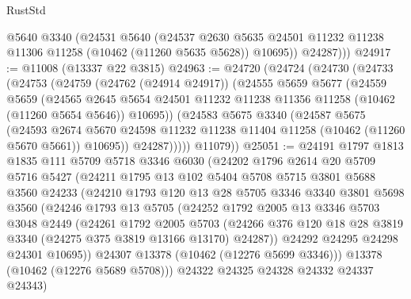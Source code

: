 \begin{lexlean}{RustStd}
\begin{coremodule}
          @5640
          @3340
          (@24531
            @5640
            (@24537
              @2630
              @5635
              @24501
              @11232
              @11238
              @11306
              @11258
              (@10462 (@11260 @5635 @5628))
              @10695))
          @24287)))
@24917 := @11008 (@13337 @22 @3815)
@24963 := @24720
    (@24724
      (@24730
        (@24733
          (@24753
            (@24759
              (@24762 (@24914 @24917))
              (@24555
                @5659
                @5677
                (@24559
                  @5659
                  (@24565
                    @2645
                    @5654
                    @24501
                    @11232
                    @11238
                    @11356
                    @11258
                    (@10462 (@11260 @5654 @5646))
                    @10695))
                (@24583
                  @5675
                  @3340
                  (@24587
                    @5675
                    (@24593
                      @2674
                      @5670
                      @24598
                      @11232
                      @11238
                      @11404
                      @11258
                      (@10462 (@11260 @5670 @5661))
                      @10695))
                  @24287)))))
        @11079))
@25051 := @24191
    @1797
    @1813
    @1835
    @111
    @5709
    @5718
    @3346
    @6030
    (@24202
      @1796
      @2614
      @20
      @5709
      @5716
      @5427
      (@24211
        @1795
        @13
        @102
        @5404
        @5708
        @5715
        @3801
        @5688
        @3560
        @24233
        (@24210
          @1793
          @120
          @13
          @28
          @5705
          @3346
          @3340
          @3801
          @5698
          @3560
          (@24246
            @1793
            @13
            @5705
            (@24252
              @1792
              @2005
              @13
              @3346
              @5703
              @3048
              @2449
              (@24261
                @1792
                @2005
                @5703
                (@24266 @376 @120 @18 @28 @3819 @3340 (@24275 @375 @3819 @13166 @13170) @24287))
              @24292
              @24295
              @24298
              @24301
              @10695))
          @24307
          @13378
          (@10462 (@12276 @5699 @3346)))
        @13378
        (@10462 (@12276 @5689 @5708)))
      @24322
      @24325
      @24328
      @24332
      @24337
      @24343)

\end{coremodule}
\end{lexlean}
